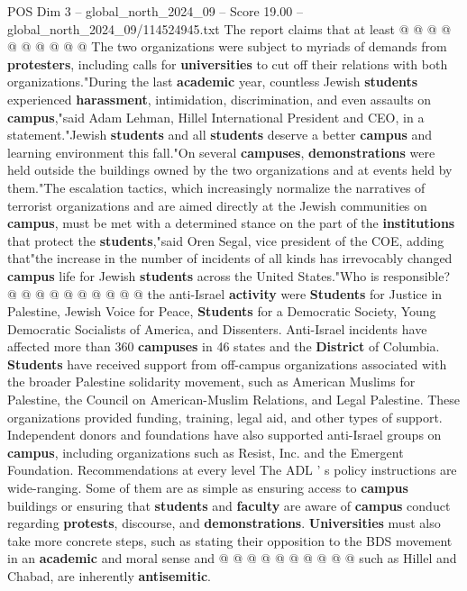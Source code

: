\begin{textsample}{POS Dim 3 – global\_north\_2024\_09 – Score 19.00 – global\_north\_2024\_09/114524945.txt}
The report claims that at least @ @ @ @ @ @ @ @ @ @ The two organizations were subject to myriads of demands from \textbf{protesters}, including calls for \textbf{universities} to cut off their relations with both organizations."During the last \textbf{academic} year, countless Jewish \textbf{students} experienced \textbf{harassment}, intimidation, discrimination, and even assaults on \textbf{campus},"said Adam Lehman, Hillel International President and CEO, in a statement."Jewish \textbf{students} and all \textbf{students} deserve a better \textbf{campus} and learning environment this fall."On several \textbf{campuses}, \textbf{demonstrations} were held outside the buildings owned by the two organizations and at events held by them."The escalation tactics, which increasingly normalize the narratives of terrorist organizations and are aimed directly at the Jewish communities on \textbf{campus}, must be met with a determined stance on the part of the \textbf{institutions} that protect the \textbf{students},"said Oren Segal, vice president of the COE, adding that"the increase in the number of incidents of all kinds has irrevocably changed \textbf{campus} life for Jewish \textbf{students} across the United States."Who is responsible? @ @ @ @ @ @ @ @ @ @ the anti-Israel \textbf{activity} were \textbf{Students} for Justice in Palestine, Jewish Voice for Peace, \textbf{Students} for a Democratic Society, Young Democratic Socialists of America, and Dissenters.
Anti-Israel incidents have affected more than 360 \textbf{campuses} in 46 states and the \textbf{District} of Columbia. \textbf{Students} have received support from off-campus organizations associated with the broader Palestine solidarity movement, such as American Muslims for Palestine, the Council on American-Muslim Relations, and Legal Palestine.
These organizations provided funding, training, legal aid, and other types of support.
Independent donors and foundations have also supported anti-Israel groups on \textbf{campus}, including organizations such as Resist, Inc. and the Emergent Foundation.
Recommendations at every level The ADL ' s policy instructions are wide-ranging.
Some of them are as simple as ensuring access to \textbf{campus} buildings or ensuring that \textbf{students} and \textbf{faculty} are aware of \textbf{campus} conduct regarding \textbf{protests}, discourse, and \textbf{demonstrations}. \textbf{Universities} must also take more concrete steps, such as stating their opposition to the BDS movement in an \textbf{academic} and moral sense and @ @ @ @ @ @ @ @ @ @ such as Hillel and Chabad, are inherently \textbf{antisemitic}.

\end{textsample}
